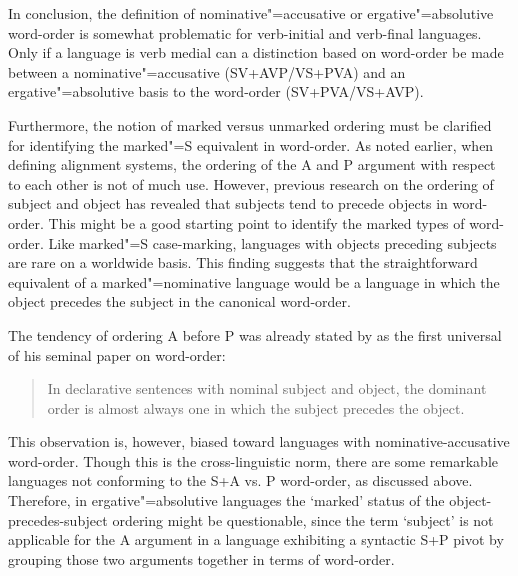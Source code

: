 In conclusion, the definition of nominative"=accusative or ergative"=absolutive word-order is somewhat problematic for verb-initial and verb-final languages. 
Only if a language is verb medial can a distinction based on word-order be made between a nominative"=accusative (SV+AVP/VS+PVA) and an ergative"=absolutive basis to the word-order (SV+PVA/VS+AVP).

Furthermore, the notion of marked versus unmarked ordering must be clarified for identifying the marked"=S equivalent in word-order.
As noted earlier, when defining alignment systems, the ordering of the A and P argument with respect to each other is not of much use. However, previous research on the ordering of subject and object has revealed that subjects tend to precede objects in word-order. 
This might be a good starting point to identify the marked types of word-order. Like marked"=S case-marking, languages with objects preceding subjects are rare on a worldwide basis. This finding suggests that the straightforward equivalent of a marked"=nominative language would be a language in which the object precedes the subject in the canonical word-order. 

The tendency of ordering A before P was already stated by \citeauthor{Greenberg:1963} as the first universal of his seminal paper on word-order: 

\begin{quote}
In declarative sentences with nominal subject and object, the dominant order is almost always one in which the subject precedes the object. 
 \citep[61]{Greenberg:1963}
\end{quote}

This observation is, however, biased toward languages with no\-mi\-na\-tive-ac\-cu\-sa\-tive word-order.
Though this is the cross-linguistic norm, there are some remarkable languages not conforming to the S+A vs. P word-order, as discussed above.
Therefore, in ergative"=absolutive languages the `marked' status of the object-precedes-subject ordering might be questionable, since the term `subject' is not applicable for the A argument in a language exhibiting a syntactic S+P pivot by grouping those two arguments together in terms of word-order.

